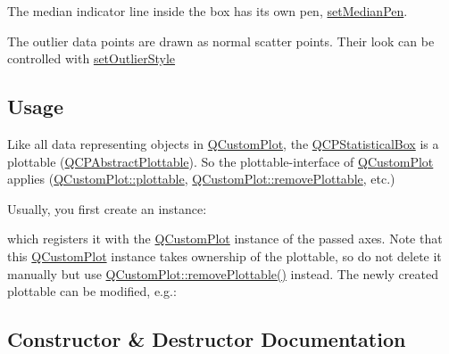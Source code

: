 The median indicator line inside the box has its own pen, \hyperlink{class_q_c_p_statistical_box_a7260ac55b669f5d0a74f16d5ca84c52c}{set\+Median\+Pen}.

The outlier data points are drawn as normal scatter points. Their look can be controlled with \hyperlink{class_q_c_p_statistical_box_ad5241943422eb8e58360a97e99ad6aa7}{set\+Outlier\+Style}\hypertarget{class_q_c_p_statistical_box_qcpstatisticalbox-usage}{}\subsection{Usage}\label{class_q_c_p_statistical_box_qcpstatisticalbox-usage}
Like all data representing objects in \hyperlink{class_q_custom_plot}{Q\+Custom\+Plot}, the \hyperlink{class_q_c_p_statistical_box}{Q\+C\+P\+Statistical\+Box} is a plottable (\hyperlink{class_q_c_p_abstract_plottable}{Q\+C\+P\+Abstract\+Plottable}). So the plottable-\/interface of \hyperlink{class_q_custom_plot}{Q\+Custom\+Plot} applies (\hyperlink{class_q_custom_plot_a32de81ff53e263e785b83b52ecd99d6f}{Q\+Custom\+Plot\+::plottable}, \hyperlink{class_q_custom_plot_af3dafd56884208474f311d6226513ab2}{Q\+Custom\+Plot\+::remove\+Plottable}, etc.)

Usually, you first create an instance\+: 
\begin{DoxyCodeInclude}
\end{DoxyCodeInclude}
which registers it with the \hyperlink{class_q_custom_plot}{Q\+Custom\+Plot} instance of the passed axes. Note that this \hyperlink{class_q_custom_plot}{Q\+Custom\+Plot} instance takes ownership of the plottable, so do not delete it manually but use \hyperlink{class_q_custom_plot_af3dafd56884208474f311d6226513ab2}{Q\+Custom\+Plot\+::remove\+Plottable()} instead. The newly created plottable can be modified, e.\+g.\+: 
\begin{DoxyCodeInclude}
\end{DoxyCodeInclude}


\subsection{Constructor \& Destructor Documentation}
\mbox{\label{class_q_c_p_statistical_box_a75c2b3e7fcd0741cc981693a2ba63b27}} 
